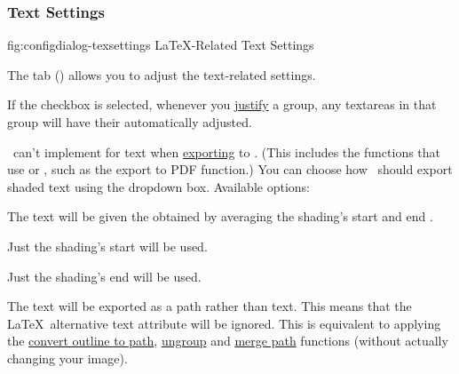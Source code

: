 \subsubsection{Text Settings}\label{sec:texconfigtext}


\FloatFig
  {fig:configdialog-texsettings}
  {}
  {LaTeX-Related Text Settings}

The  tab
()
allows you to adjust the text-related settings.


If the  \gls{checkbox} is selected,
whenever you \hyperref[sec:alignobjects]{justify} a \gls{group}, any
\glspl{textarea} in that group will have their
 automatically adjusted.


\FlowframTk\ can't implement  for text when
\hyperref[sec:exportpgf]{exporting} to . (This includes the
 functions that use  or , such as
the export to PDF function.) You can choose how \FlowframTk\ should export
shaded text using the  dropdown
box. Available options:

\begin{deflist}
\itemtitle
 {}

\begin{itemdesc}
The text will be given the  obtained by averaging the
shading's start and end .
\end{itemdesc}

\itemtitle
 {}

\begin{itemdesc}
Just the shading's start  will be used.
\end{itemdesc}

\itemtitle
 {}

\begin{itemdesc}
Just the shading's end  will be used.
\end{itemdesc}

\itemtitle
 {}

\begin{itemdesc}
The text will be exported as a path rather than text. This means
that the \LaTeX\ alternative text attribute will be ignored. This is
equivalent to applying the 
\hyperref[sec:outlinetopath]{convert outline to path}, 
\hyperref[sec:grouping]{ungroup} and 
\hyperref[sec:mergepaths]{merge path}
functions (without actually changing your image).
\end{itemdesc}

\end{deflist}

